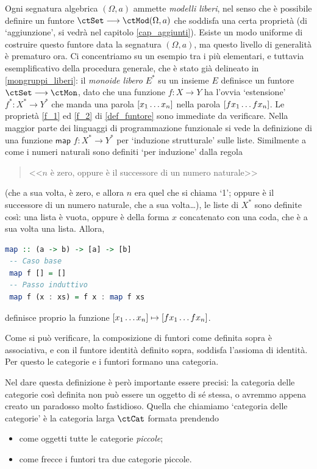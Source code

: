 \begin{example}\label{funtori_liberi}
 Ogni segnatura algebrica \((\Omega,a)\) ammette \emph{modelli liberi}, nel senso che è possibile definire un funtore \(\ctSet\fun\ctMod(\Omega,a)\) che soddisfa una certa proprietà (di `aggiunzione', si vedrà nel capitolo \ref{cap_aggiunti}). Esiste un modo uniforme di costruire questo funtore data la segnatura \((\Omega,a)\), ma questo livello di generalità è prematuro ora. Ci concentriamo su un esempio tra i più elementari, e tuttavia esemplificativo della procedura generale, che è stato già delineato in \ref{mongruppi_liberi}: il \emph{monoide libero} \(E^*\) su un insieme \(E\) definisce un funtore \(\ctSet\fun\ctMon\), dato che una funzione \(f \colon X\to Y\) ha l'ovvia `estensione' \(f^* \colon X^*\to Y^*\) che manda una parola \([\tup xn{}]\) nella parola \([\tup {fx}n{}]\). Le proprietà \ref{f_1} ed \ref{f_2} di \ref{def_funtore} sono immediate da verificare. Nella maggior parte dei linguaggi di programmazione funzionale si vede la definizione di una funzione \(\textsf{map } f \colon X^* \to Y^*\) per `induzione strutturale' sulle liste. Similmente a come i numeri naturali sono definiti `per induzione' dalla regola
 \begin{quote}
  <<\(n\) è zero, oppure è il successore di un numero naturale>>
 \end{quote}
 (che a sua volta, è zero, e allora \(n\) era quel che si chiama `1'; oppure è il successore di un numero naturale, che a sua volta\dots), le liste di \(X^*\) sono definite così: una lista è vuota, oppure è della forma \(x\) concatenato con una coda, che è a sua volta una lista. Allora,
 \begin{lstlisting}[language=haskell]
 map :: (a -> b) -> [a] -> [b]
 -- Caso base
 map f [] = []
 -- Passo induttivo
 map f (x : xs) = f x : map f xs
	\end{lstlisting}
 definisce proprio la funzione \([\tup xn{}]\mapsto [\tup {fx}n{}]\).
\end{example}
\begin{definition}\label{ex_cat_cat}
 Come si può verificare, la composizione di funtori come definita sopra è associativa, e con il funtore identità definito sopra, soddisfa l'assioma di identità. Per questo le categorie e i funtori formano una categoria.

 Nel dare questa definizione è però importante essere precisi: la categoria delle categorie così definita non può essere un oggetto di sé stessa, o avremmo appena creato un paradosso molto fastidioso. Quella che chiamiamo `categoria delle categorie' è la categoria larga \(\ctCat\)  formata prendendo
 \begin{itemize}
  \item come oggetti tutte le categorie \emph{piccole};
  \item come frecce i funtori tra due categorie piccole.
 \end{itemize}
\end{definition}

